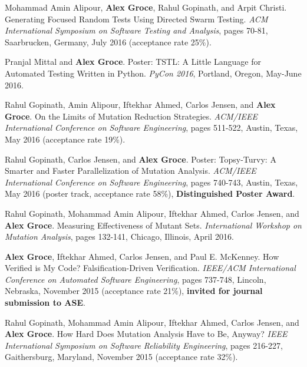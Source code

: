 \documentclass[ComputerScience]{vita}
\begin{document}
\begin{vita}
\begin{Refereed Conference and Workshop Publications}
\item Mohammad Amin Alipour, {\bf Alex Groce}, Rahul Gopinath, and Arpit Christi.
\newblock Generating Focused Random Tests Using Directed Swarm Testing.
\newblock \emph{ACM International Symposium on Software Testing and Analysis}, pages 70-81, Saarbrucken, Germany, July 2016 (acceptance rate 25\%).

\item Pranjal Mittal and {\bf Alex Groce}.
\newblock Poster: TSTL: A Little Language for Automated Testing Written in Python.
\newblock \emph{PyCon 2016}, Portland, Oregon, May-June 2016.

\item Rahul Gopinath, Amin Alipour, Iftekhar Ahmed, Carlos Jensen, and {\bf Alex Groce}.
\newblock On the Limits of Mutation Reduction Strategies.
\newblock \emph{ACM/IEEE International Conference on Software Engineering}, pages 511-522, Austin, Texas, May 2016 (acceptance rate 19\%).

\item Rahul Gopinath, Carlos Jensen, and {\bf Alex Groce}.
\newblock Poster: Topsy-Turvy: A Smarter and Faster Parallelization of Mutation Analysis.
\newblock \emph{ACM/IEEE International Conference on Software Engineering}, pages 740-743, Austin, Texas, May 2016 (poster track, acceptance rate 58\%), {\bf Distinguished Poster Award}.

\item Rahul Gopinath, Mohammad Amin Alipour, Iftekhar Ahmed, Carlos Jensen, and {\bf Alex Groce}.
\newblock Measuring Effectiveness of Mutant Sets.
\newblock \emph{International Workshop on Mutation Analysis}, pages 132-141, Chicago, Illinois, April 2016.

\item {\bf Alex Groce}, Iftekhar Ahmed, Carlos Jensen, and Paul E. McKenney.
\newblock How Verified is My Code? Falsification-Driven Verification.
\newblock \emph{IEEE/ACM International Conference on Automated Software Engineering}, pages 737-748, Lincoln, Nebraska, November 2015 (acceptance rate 21\%), {\bf invited for journal submission to ASE}.

\item Rahul Gopinath, Mohammad Amin Alipour, Iftekhar Ahmed, Carlos Jensen, and {\bf Alex Groce}.
\newblock How Hard Does Mutation Analysis Have to Be, Anyway?
\newblock \emph{IEEE International Symposium on Software Reliability Engineering}, pages 216-227, Gaithersburg, Maryland, November 2015 (acceptance rate 32\%).



\end{Refereed Conference and Workshop Publications}
\end{vita}
\end{document}
